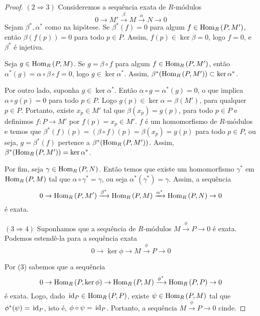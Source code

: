 \begin{teo}
\begin{proof}
$(2 \Rightarrow 3)$ Consideremos a sequência exata de $R$-módulos \[0 \rightarrow M' \xrightarrow{\beta} M \xrightarrow{\alpha} N \rightarrow 0\]
Sejam $\beta^*, \alpha^*$ como na hipótese. Se $\beta^*(f)=0$ para algum $f \in \textrm{Hom}_{R}\left( P,M' \right)$, então $\beta(f(p))=0$ para todo $p \in P$. Assim, $f(p) \in \ker\beta=0$, logo $f = 0$, e $\beta^*$ é injetiva. \par
Seja $g \in \textrm{Hom}_{R}\left( P,M \right)$. Se $g=\beta\circ f$ para algum $f\in \textrm{Hom}_{R}\left( P,M' \right)$, então $\alpha^*(g) = \alpha\circ \beta \circ f = 0$, logo $g \in \ker\alpha^*$. Assim, $\beta^{*}(\textrm{Hom}_{R}\left( P,M' \right))\subset \ker\alpha^*$. \par
Por outro lado, suponha $g \in \ker\alpha^*$. Então $\alpha\circ g = \alpha^*(g) = 0$, o que implica $\alpha \circ g(p)=0$ para todo $p \in P$. Logo $g(p)\in \ker\alpha=\beta(M')$, para qualquer $p \in P$. Portanto, existe $x_p \in M'$ tal que $\beta(x_p)=g(p)$, para todo $p \in P$ e definimos $f: P \rightarrow M'$ por $f(p)=x_p \in M'$. $f$ é um homomorfismo de $R$-módulos e temos que $\beta^*(f)(p)=(\beta\circ f)(p)=\beta(x_p)=g(p)$ para todo $p \in P$, ou seja, $g=\beta^*(f)$ pertence a $\beta^*(\textrm{Hom}_{R}\left( P,M' \right))$. Assim, $\beta^*(\textrm{Hom}_{R}\left( P,M' \right))=\ker\alpha^*$. \par
Por fim, seja $\gamma \in \textrm{Hom}_{R}\left( P,N \right)$. Então temos que existe um homomorfismo $\gamma^*$ em $\textrm{Hom}_{R}\left( P,M \right)$ tal que $\alpha\circ \gamma^* = \gamma$, ou seja $\alpha^*(\gamma^*)=\gamma$. Assim, a sequência
\[0\rightarrow \textrm{Hom}_{R}\left( P,M' \right) \xrightarrow{\beta^*} \textrm{Hom}_{R}\left( P,M \right) \xrightarrow{\alpha^*} \textrm{Hom}_{R}\left( P,N \right) \rightarrow 0\] é exata.

$(3 \Rightarrow 4)$ Suponhamos que a sequência de $R$-módulos $M\xrightarrow{\phi} P \rightarrow 0$ é exata. Podemos estendê-la para a sequência exata \[0 \rightarrow \ker\phi \rightarrow M \xrightarrow{\phi} P \rightarrow 0\] \par
Por (3) sabemos que a sequência \[0 \rightarrow \textrm{Hom}_{R}\left( P,\ker\phi \right) \rightarrow \textrm{Hom}_{R}\left( P,M \right) \xrightarrow{\phi^*} \textrm{Hom}_{R}\left( P,P \right) \rightarrow 0 \] é exata. Logo, dado $\, \textrm{id}_{P} \in \textrm{Hom}_{R}\left( P,P \right)$, existe $\psi \in \textrm{Hom}_{R}\left( P,M \right)$ tal que $\phi^*(\psi)=\, \textrm{id}_{P}$, isto é, $\phi\circ \psi = \, \textrm{id}_{P}$. Portanto, a sequência $M\xrightarrow{\phi}P\rightarrow 0$ cinde.


\end{proof}
\end{teo}
